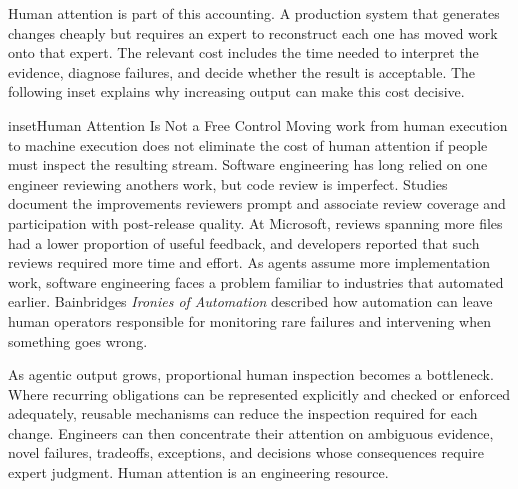 
Human attention is part of this accounting. A production system that generates changes cheaply but requires an expert to reconstruct each one has moved work onto that expert. The relevant cost includes the time needed to interpret the evidence, diagnose failures, and decide whether the result is acceptable. The following inset explains why increasing output can make this cost decisive.





\begin{bookbox}{inset}{Human Attention Is Not a Free Control}
\label{inset-human-attention-not-a-free-control}
Moving work from human execution to machine execution does not eliminate the cost of human attention if people must inspect the resulting stream. Software engineering has long relied on one engineer reviewing another\textquotesingle s work, but code review is imperfect. Studies document the improvements reviewers prompt and associate review coverage and participation with post-release quality\citep{beller2014modern, mcintosh2014impact}. At Microsoft, reviews spanning more files had a lower proportion of useful feedback, and developers reported that such reviews required more time and effort\citep{bosu2015useful}. As agents assume more implementation work, software engineering faces a problem familiar to industries that automated earlier. Bainbridge\textquotesingle s \emph{Ironies of Automation} described how automation can leave human operators responsible for monitoring rare failures and intervening when something goes wrong\citep{bainbridge1983}.

As agentic output grows, proportional human inspection becomes a bottleneck. Where recurring obligations can be represented explicitly and checked or enforced adequately, reusable mechanisms can reduce the inspection required for each change. Engineers can then concentrate their attention on ambiguous evidence, novel failures, tradeoffs, exceptions, and decisions whose consequences require expert judgment. Human attention is an engineering resource.
\end{bookbox}

